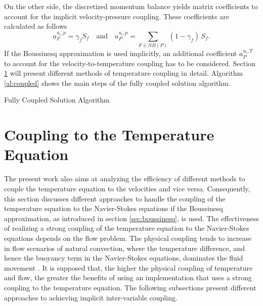 On the other side, the discretized momentum balance yields matrix coefficients to account for the implicit velocity-pressure coupling. These coefficients are calculated as follows
\begin{displaymath}
  a_F^{u_i,p} =  \gamma_f S_f \quad \text{and} \quad a_P^{u_i,p} = \sum_{F \in NB(P)} (1-\gamma_f) \, S_f.
\end{displaymath}
If the Boussinesq approximation is used implicitly, an additional coefficient \(a_P^{u_i,T}\) to account for the velocity-to-temperature coupling has to be considered. Section \ref{sec:temperaturecoupling} will present different methods of temperature coupling in detail. Algorithm \ref{al:coupled} shows the main steps of the fully coupled solution algorithm.

\begin{algorithm}
\label{al:coupled}
\caption{Fully Coupled Solution Algorithm}
\begin{algorithmic}
\Else
\EndIf
{}
\EndIf
\EndWhile
{}
\EndIf
\end{algorithmic}
\end{algorithm}

\section{Coupling to the Temperature Equation}
\label{sec:temperaturecoupling}

The present work also aims at analyzing the efficiency of different methods to couple the temperature equation to the velocities and vice versa. Consequently, this section discusses different approaches to handle the coupling of the temperature equation to the Navier-Stokes equations if the Boussinesq approximation, as introduced in section \ref{sec:boussinesq}, is used. The effectiveness of realizing a strong coupling of the temperature equation to the Navier-Stokes equations depends on the flow problem. The physical coupling tends to increase in flow scenarios of natural convection, where the temperature difference, and hence the buoyancy term in the Navier-Stokes equations, dominates the fluid movement \cite{ferziger02,vakilipour12}. It is supposed that, the higher the physical coupling of temperature and flow, the greater the benefits of using an implementation that uses a strong coupling to the temperature equation. The following subsections present different approaches to achieving implicit inter-variable coupling.
      
